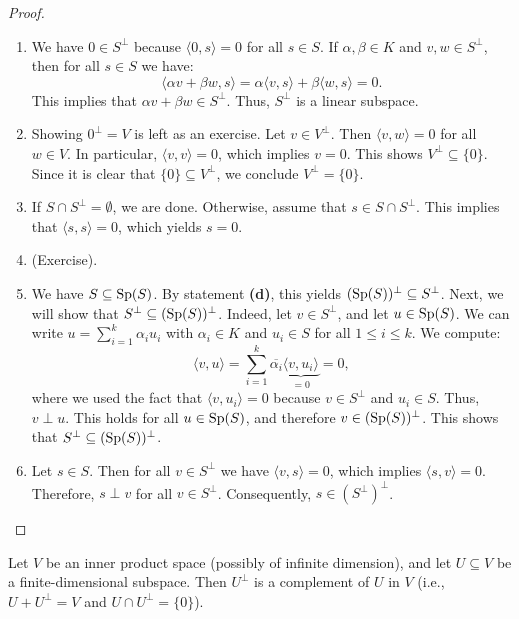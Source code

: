 \begin{proof}
\begin{enumerate}[label=\textbf{(\alph*)}]
    \item We have $0 \in S^\perp$ because $\langle 0, s \rangle = 0$ for all $s \in S$.
    If $\alpha, \beta \in K$ and $v, w \in S^\perp$, then for all $s \in S$ we have:
    \[
        \langle \alpha v + \beta w, s \rangle = \alpha \langle v, s \rangle + \beta \langle w, s \rangle = 0.
    \]
    This implies that $\alpha v + \beta w \in S^\perp$. Thus, $S^\perp$ is a linear subspace.
    
    \item Showing $0^\perp = V$ is left as an exercise. Let $v \in V^\perp$. Then $\langle v, w \rangle = 0$ for all $w \in V$. In particular, $\langle v, v \rangle = 0$, which implies $v = 0$. This shows $V^\perp \subseteq \{0\}$. Since it is clear that $\{0\} \subseteq V^\perp$, we conclude $V^\perp = \{0\}$.
    
    \item If $S \cap S^\perp = \emptyset$, we are done. Otherwise, assume that $s \in S \cap S^\perp$. This implies that $\langle s, s \rangle = 0$, which yields $s = 0$.
    
    \item (Exercise).
    
    \item We have $S \subseteq \operatorname{Sp}(S)$. By statement \textbf{(d)}, this yields $(\operatorname{Sp}(S))^\perp \subseteq S^\perp$.
    Next, we will show that $S^\perp \subseteq (\operatorname{Sp}(S))^\perp$. Indeed, let $v \in S^\perp$, and let $u \in \operatorname{Sp}(S)$. We can write $u = \sum_{i=1}^k \alpha_i u_i$ with $\alpha_i \in K$ and $u_i \in S$ for all $1 \leq i \leq k$. We compute:
    \[
        \langle v, u \rangle = \sum_{i=1}^k \overline{\alpha_i} \underbrace{\langle v, u_i \rangle}_{= 0} = 0,
    \]
    where we used the fact that $\langle v, u_i \rangle = 0$ because $v \in S^\perp$ and $u_i \in S$. Thus, $v \perp u$. This holds for all $u \in \operatorname{Sp}(S)$, and therefore $v \in (\operatorname{Sp}(S))^\perp$. This shows that $S^\perp \subseteq (\operatorname{Sp}(S))^\perp$.
    
    \item Let $s \in S$. Then for all $v \in S^\perp$ we have $\langle v, s \rangle = 0$, which implies $\langle s, v \rangle = 0$. Therefore, $s \perp v$ for all $v \in S^\perp$. Consequently, $s \in (S^\perp)^\perp$.
\end{enumerate}
\end{proof}

\begin{theorem}
\label{thm:orthogonal_complement_finite_dim}
Let $V$ be an inner product space (possibly of infinite dimension), and let $U \subseteq V$ be a finite-di\-men\-sional subspace. Then $U^\perp$ is a complement of $U$ in $V$ (i.e., $U + U^\perp = V$ and $U \cap U^\perp = \{0\}$).
\end{theorem}

